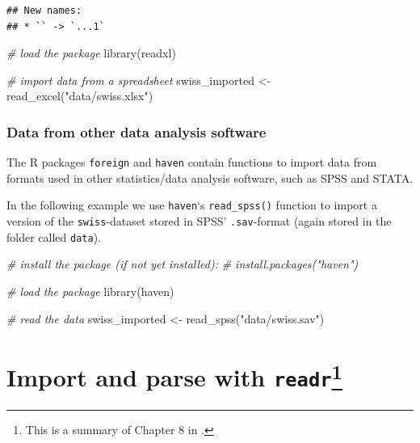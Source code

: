 \documentclass[
  12pt,
]{style/krantz}
\newenvironment{Shaded}{\begin{snugshade}}{\end{snugshade}}
\newcommand{\CommentTok}[1]{\textcolor[rgb]{0.56,0.35,0.01}{\textit{#1}}}
\newcommand{\FunctionTok}[1]{\textcolor[rgb]{0.00,0.00,0.00}{#1}}
\newcommand{\NormalTok}[1]{#1}
\newcommand{\OtherTok}[1]{\textcolor[rgb]{0.56,0.35,0.01}{#1}}
\newcommand{\StringTok}[1]{\textcolor[rgb]{0.31,0.60,0.02}{#1}}
\begin{document}
\begin{verbatim}
## New names:
## * `` -> `...1`
\end{verbatim}

\begin{Shaded}
\begin{Highlighting}[]
\CommentTok{\# load the package}
\FunctionTok{library}\NormalTok{(readxl)}

\CommentTok{\# import data from a spreadsheet}
\NormalTok{swiss\_imported }\OtherTok{\textless{}{-}} \FunctionTok{read\_excel}\NormalTok{(}\StringTok{"data/swiss.xlsx"}\NormalTok{)}
\end{Highlighting}
\end{Shaded}

\hypertarget{data-from-other-data-analysis-software}{%
\subsubsection{Data from other data analysis software}\label{data-from-other-data-analysis-software}}

The R packages \texttt{foreign} and \texttt{haven} contain functions to import data from formats used in other statistics/data analysis software, such as SPSS and STATA.

In the following example we use \texttt{haven}`s \texttt{read\_spss()} function to import a version of the \texttt{swiss}-dataset stored in SPSS' \texttt{.sav}-format (again stored in the folder called \texttt{data}).

\begin{Shaded}
\begin{Highlighting}[]
\CommentTok{\# install the package (if not yet installed):}
\CommentTok{\# install.packages("haven")}

\CommentTok{\# load the package}
\FunctionTok{library}\NormalTok{(haven)}

\CommentTok{\# read the data}
\NormalTok{swiss\_imported }\OtherTok{\textless{}{-}} \FunctionTok{read\_spss}\NormalTok{(}\StringTok{"data/swiss.sav"}\NormalTok{)}
\end{Highlighting}
\end{Shaded}

\hypertarget{import-and-parse-with-readr}{%
\section[Import and parse with \texttt{readr}]{\texorpdfstring{Import and parse with \texttt{readr}\footnote{This is a summary of Chapter 8 in \citet{wickham_grolemund2017}.}}{Import and parse with readr}}\label{import-and-parse-with-readr}}
\end{document}
